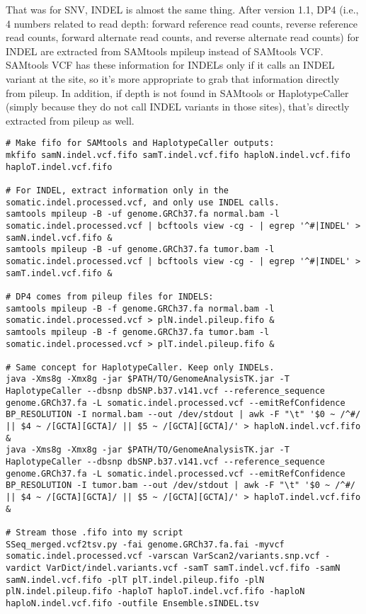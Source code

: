 \documentclass[10pt,letterpaper]{article}
\begin{document}
\begin{sloppypar}
That was for SNV, INDEL is almost the same thing. After version 1.1, DP4 (i.e., 4 numbers related to read depth: forward reference read counts, reverse reference read counts, forward alternate read counts, and reverse alternate read counts) for INDEL are extracted from SAMtools mpileup instead of SAMtools VCF. SAMtools VCF has these information for INDELs only if it calls an INDEL variant at the site, so it's more appropriate to grab that information directly from pileup. In addition, if depth is not found in SAMtools or HaplotypeCaller (simply because they do not call INDEL variants in those sites), that's directly extracted from pileup as well. 

\begin{lstlisting}
# Make fifo for SAMtools and HaplotypeCaller outputs:
mkfifo samN.indel.vcf.fifo samT.indel.vcf.fifo haploN.indel.vcf.fifo haploT.indel.vcf.fifo

# For INDEL, extract information only in the somatic.indel.processed.vcf, and only use INDEL calls.
samtools mpileup -B -uf genome.GRCh37.fa normal.bam -l somatic.indel.processed.vcf | bcftools view -cg - | egrep '^#|INDEL' > samN.indel.vcf.fifo &
samtools mpileup -B -uf genome.GRCh37.fa tumor.bam -l somatic.indel.processed.vcf | bcftools view -cg - | egrep '^#|INDEL' > samT.indel.vcf.fifo &

# DP4 comes from pileup files for INDELS:
samtools mpileup -B -f genome.GRCh37.fa normal.bam -l somatic.indel.processed.vcf > plN.indel.pileup.fifo &
samtools mpileup -B -f genome.GRCh37.fa tumor.bam -l somatic.indel.processed.vcf > plT.indel.pileup.fifo &

# Same concept for HaplotypeCaller. Keep only INDELs.
java -Xms8g -Xmx8g -jar $PATH/TO/GenomeAnalysisTK.jar -T HaplotypeCaller --dbsnp dbSNP.b37.v141.vcf --reference_sequence genome.GRCh37.fa -L somatic.indel.processed.vcf --emitRefConfidence BP_RESOLUTION -I normal.bam --out /dev/stdout | awk -F "\t" '$0 ~ /^#/ || $4 ~ /[GCTA][GCTA]/ || $5 ~ /[GCTA][GCTA]/' > haploN.indel.vcf.fifo &
java -Xms8g -Xmx8g -jar $PATH/TO/GenomeAnalysisTK.jar -T HaplotypeCaller --dbsnp dbSNP.b37.v141.vcf --reference_sequence genome.GRCh37.fa -L somatic.indel.processed.vcf --emitRefConfidence BP_RESOLUTION -I tumor.bam --out /dev/stdout | awk -F "\t" '$0 ~ /^#/ || $4 ~ /[GCTA][GCTA]/ || $5 ~ /[GCTA][GCTA]/' > haploT.indel.vcf.fifo &

# Stream those .fifo into my script		
SSeq_merged.vcf2tsv.py -fai genome.GRCh37.fa.fai -myvcf somatic.indel.processed.vcf -varscan VarScan2/variants.snp.vcf -vardict VarDict/indel.variants.vcf -samT samT.indel.vcf.fifo -samN samN.indel.vcf.fifo -plT plT.indel.pileup.fifo -plN plN.indel.pileup.fifo -haploT haploT.indel.vcf.fifo -haploN haploN.indel.vcf.fifo -outfile Ensemble.sINDEL.tsv
\end{lstlisting}



\end{sloppypar}
\end{document}
